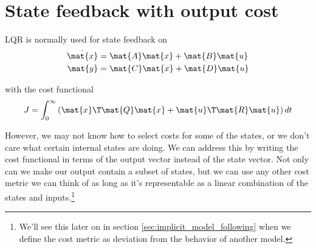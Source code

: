 \section{State feedback with output cost}

LQR is normally used for state feedback on
\begin{align*}
  \dot{\mat{x}} &= \mat{A}\mat{x} + \mat{B}\mat{u} \\
  \mat{y} &= \mat{C}\mat{x} + \mat{D}\mat{u}
\end{align*}

with the cost functional
\begin{equation*}
  J = \int_0^\infty \left(\mat{x}\T\mat{Q}\mat{x} +
    \mat{u}\T\mat{R}\mat{u}\right) dt
\end{equation*}

However, we may not know how to select costs for some of the states, or we don't
care what certain internal states are doing. We can address this by writing the
cost functional in terms of the output vector instead of the state vector. Not
only can we make our output contain a subset of states, but we can use any other
cost metric we can think of as long as it's representable as a linear
combination of the states and inputs.\footnote{We'll see this later on in
section \ref{sec:implicit_model_following} when we define the cost metric as
deviation from the behavior of another model.}

